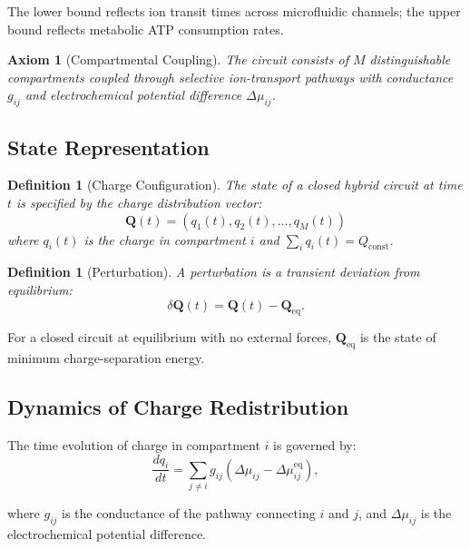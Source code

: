 \documentclass[twocolumn,10pt]{article}
\newtheorem{definition}[theorem]{Definition}
\newtheorem{axiom}{Axiom}
\theoremstyle{remark}
\begin{document}
The lower bound reflects ion transit times across microfluidic channels; the upper bound reflects metabolic ATP consumption rates.

\begin{axiom}[Compartmental Coupling]
\label{ax:coupling}
The circuit consists of $M$ distinguishable compartments coupled through selective ion-transport pathways with conductance $g_{ij}$ and electrochemical potential difference $\Delta\mu_{ij}$.
\end{axiom}

\subsection{State Representation}

\begin{definition}[Charge Configuration]
\label{def:config}
The state of a closed hybrid circuit at time $t$ is specified by the charge distribution vector:
\begin{equation}
  \mathbf{Q}(t) = (q_1(t), q_2(t), \ldots, q_M(t))
\end{equation}
where $q_i(t)$ is the charge in compartment $i$ and $\sum_i q_i(t) = Q_{\mathrm{const}}$.
\end{definition}

\begin{definition}[Perturbation]
\label{def:perturbation}
A perturbation is a transient deviation from equilibrium:
\begin{equation}
  \delta \mathbf{Q}(t) = \mathbf{Q}(t) - \mathbf{Q}_{\mathrm{eq}}.
\end{equation}
\end{definition}

For a closed circuit at equilibrium with no external forces, $\mathbf{Q}_{\mathrm{eq}}$ is the state of minimum charge-separation energy.

\subsection{Dynamics of Charge Redistribution}

The time evolution of charge in compartment $i$ is governed by:
\begin{equation}
  \frac{dq_i}{dt} = \sum_{j \neq i} g_{ij}(\Delta\mu_{ij} - \Delta\mu_{ij}^{\mathrm{eq}}),
  \label{eq:transport}
\end{equation}

where $g_{ij}$ is the conductance of the pathway connecting $i$ and $j$, and $\Delta\mu_{ij}$ is the electrochemical potential difference.
\end{document}

